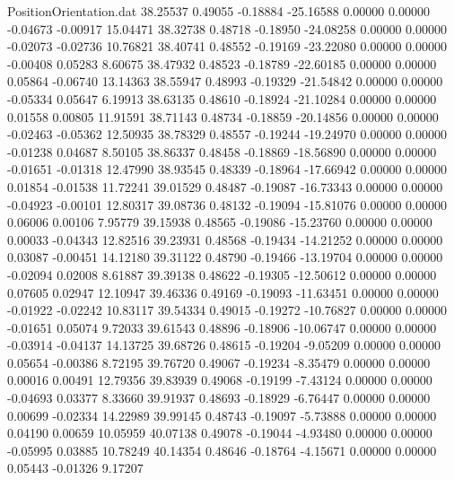 \begin{filecontents}{PositionOrientation.dat}
  38.25537    0.49055   -0.18884   -25.16588    0.00000    0.00000   -0.04673   -0.00917   15.04471
  38.32738    0.48718   -0.18950   -24.08258    0.00000    0.00000   -0.02073   -0.02736   10.76821
  38.40741    0.48552   -0.19169   -23.22080    0.00000    0.00000   -0.00408    0.05283    8.60675
  38.47932    0.48523   -0.18789   -22.60185    0.00000    0.00000    0.05864   -0.06740   13.14363
  38.55947    0.48993   -0.19329   -21.54842    0.00000    0.00000   -0.05334    0.05647    6.19913
  38.63135    0.48610   -0.18924   -21.10284    0.00000    0.00000    0.01558    0.00805   11.91591
  38.71143    0.48734   -0.18859   -20.14856    0.00000    0.00000   -0.02463   -0.05362   12.50935
  38.78329    0.48557   -0.19244   -19.24970    0.00000    0.00000   -0.01238    0.04687    8.50105
  38.86337    0.48458   -0.18869   -18.56890    0.00000    0.00000   -0.01651   -0.01318   12.47990
  38.93545    0.48339   -0.18964   -17.66942    0.00000    0.00000    0.01854   -0.01538   11.72241
  39.01529    0.48487   -0.19087   -16.73343    0.00000    0.00000   -0.04923   -0.00101   12.80317
  39.08736    0.48132   -0.19094   -15.81076    0.00000    0.00000    0.06006    0.00106    7.95779
  39.15938    0.48565   -0.19086   -15.23760    0.00000    0.00000    0.00033   -0.04343   12.82516
  39.23931    0.48568   -0.19434   -14.21252    0.00000    0.00000    0.03087   -0.00451   14.12180
  39.31122    0.48790   -0.19466   -13.19704    0.00000    0.00000   -0.02094    0.02008    8.61887
  39.39138    0.48622   -0.19305   -12.50612    0.00000    0.00000    0.07605    0.02947   12.10947
  39.46336    0.49169   -0.19093   -11.63451    0.00000    0.00000   -0.01922   -0.02242   10.83117
  39.54334    0.49015   -0.19272   -10.76827    0.00000    0.00000   -0.01651    0.05074    9.72033
  39.61543    0.48896   -0.18906   -10.06747    0.00000    0.00000   -0.03914   -0.04137   14.13725
  39.68726    0.48615   -0.19204    -9.05209    0.00000    0.00000    0.05654   -0.00386    8.72195
  39.76720    0.49067   -0.19234    -8.35479    0.00000    0.00000    0.00016    0.00491   12.79356
  39.83939    0.49068   -0.19199    -7.43124    0.00000    0.00000   -0.04693    0.03377    8.33660
  39.91937    0.48693   -0.18929    -6.76447    0.00000    0.00000    0.00699   -0.02334   14.22989
  39.99145    0.48743   -0.19097    -5.73888    0.00000    0.00000    0.04190    0.00659   10.05959
  40.07138    0.49078   -0.19044    -4.93480    0.00000    0.00000   -0.05995    0.03885   10.78249
  40.14354    0.48646   -0.18764    -4.15671    0.00000    0.00000    0.05443   -0.01326    9.17207

\end{filecontents}
